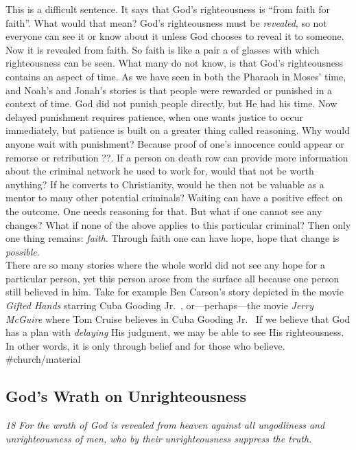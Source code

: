 This is a difficult sentence. It says that God's righteousness is ``from
faith for faith''. What would that mean? God's righteousness must be
\emph{revealed}, so not everyone can see it or know about it unless God
chooses to reveal it to someone. Now it is revealed from faith. So faith
is like a pair a of glasses with which righteousness can be seen. What
many do not know, is that God's righteousness contains an aspect of
time. As we have seen in both the Pharaoh in Moses' time, and Noah's and
Jonah's stories is that people were rewarded or punished in a context of
time. God did not punish people directly, but He had his time. Now
delayed punishment requires patience, when one wants justice to occur
immediately, but patience is built on a greater thing called reasoning.
Why would anyone wait with punishment? Because proof of one's innocence
could appear or remorse or retribution ??. If a person on death row can
provide more information about the criminal network he used to work for,
would that not be worth anything? If he converts to Christianity, would
he then not be valuable as a mentor to many other potential criminals?
Waiting can have a positive effect on the outcome. One needs reasoning
for that. But what if one cannot see any changes? What if none of the
above applies to this particular criminal? Then only one thing remains:
\emph{faith}. Through faith one can have hope, hope that change is
\emph{possible}.\\
There are so many stories where the whole world did not see any hope for
a particular person, yet this person arose from the surface all because
one person still believed in him. Take for example Ben Carson's story
depicted in the movie \emph{Gifted Hands} starring Cuba Gooding Jr.~,
or---perhaps---the movie \emph{Jerry McGuire} where Tom Cruise believes
in Cuba Gooding Jr.~ If we believe that God has a plan with
\emph{delaying} His judgment, we may be able to see His righteousness.
In other words, it is only through belief and for those who believe.
\#church/material

\subsection{God's Wrath on Unrighteousness} \emph{18 For the wrath of God is
revealed from heaven against all ungodliness and unrighteousness of men,
who by their unrighteousness suppress the truth.}

